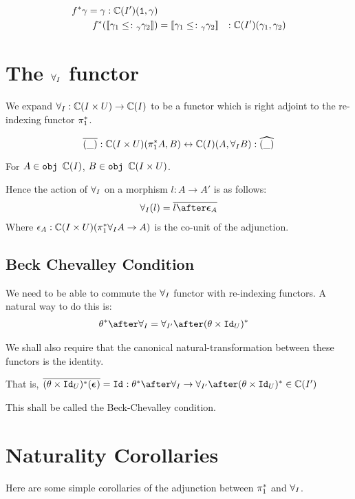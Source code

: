 \begin{align*}
    f^*{\gamma} = \gamma: \mathbb{C}(I')(\texttt{1}, \gamma)\\
    f^*({\bf [\![}\gamma_1 \leq\colon_\gamma \gamma_2{\bf ]\!]}) & = {\bf [\![}\gamma_1 \leq\colon_\gamma \gamma_2{\bf ]\!]} &: \mathbb{C}(I')(\gamma_1, \gamma_2)\\
\end{align*}

\section{The $\forall_I$ functor}

We expand $\forall_I: \mathbb{C}(I\times U) \rightarrow \mathbb{C}(I)$ to be a functor which is right adjoint to the re-indexing functor $\pi_1^*$.

\begin{equation}
    \bar{(\_)}: \C(I\times U)(\pstar A, B) \leftrightarrow \C(I)(A, \allI B) : \widehat{(\_)}
\end{equation}

For $A\in\texttt{obj }\mathbb{C}(I)$, $B\in\texttt{obj }\mathbb{C}(I\times U)$.

Hence the action of $\forall_I$ on a morphism $l : A\rightarrow A'$ is as follows:
\begin{eqnarray}
    \allI(l) = \bar{l\after\counit{A}}
\end{eqnarray}
Where $\epsilon_A: \mathbb{C}(I\times U)(\pi_1^*\forall_I A \rightarrow A)$ is the co-unit of the adjunction.

\subsection{Beck Chevalley Condition}
We need to be able to commute the $\forall_I$ functor with re-indexing functors. A natural way to do this is:
\begin{align*}
    \theta\star\after\allI & = \allII\after(\theta\times\Id{U})\star
\end{align*}

We shall also require that the canonical natural-transformation between these functors is the identity.

That is, $\bar{(\theta\times\Id{U})\star(\counit{})} = \Id{}: \theta\star\after\allI \rightarrow \allII\after(\theta\times\Id{U})\star\in \C(I')$

This shall be called the Beck-Chevalley condition.


\section{Naturality Corollaries}
Here are some simple corollaries of the adjunction between $\pi_1^*$ and $\forall_I$.
    
